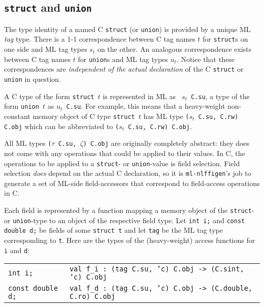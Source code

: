 \documentclass[titlepage,letterpaper]{article}
\newcommand{\gentool}{{\tt ml-nlffigen}}
\begin{document}
\subsection{{\tt struct} and {\tt union}}
 
The type identity of a named C {\tt struct} (or {\tt union}) is
provided by a unique ML {\em tag} type.  There is a 1-1 correspondence
between C tag names $t$ for {\tt struct}s on one side and ML tag types
$s_t$ on the other.  An analogous correspondence exists between C tag
names $t$ for {\tt union}s and ML tag types $u_t$.  Notice that these
correspondences are {\em independent of the actual declaration} of the
C {\tt struct} or {\tt union} in question.

A C type of the form {\tt struct $t$} is represented in ML as {\tt
  $s_t$ C.su}, a type of the form {\tt union $t$} as {\tt $u_t$ C.su}.
For example, this means that a heavy-weight non-constant memory object
of C type {\tt struct $t$} has ML type {\tt ($s_t$ C.su, C.rw) C.obj}
which can be abbreviated to {\tt ($s_t$ C.su, C.rw) C.obj}.

All ML types {\tt ($\tau$ C.su, $\zeta$) C.obj} are originally
completely abstract: they does not come with any operations that could
be applied to their values.  In C, the operations to be applied to a
{\tt struct}- or {\tt union}-value is field selection.  Field
selection {\em does} depend on the actual C declaration, so it is
{\gentool}'s job to generate a set of ML-side field-accessors that
correspond to field-access operations in C.

Each field is represented by a function mapping a memory object of the
{\tt struct}- or {\tt union}-type to an object of the respective field
type.  Let {\tt int i;} and {\tt const double d;} be fields of some
{\tt struct t} and let {\tt tag} be the ML tag type corresponding to
{\tt t}.  Here are the types of the (heavy-weight) access functions
for {\tt i} and {\tt d}:

\begin{small}
\begin{center}
\begin{tabular}{l@{~~~~$\leadsto$~~~~}l}
{\tt int i;} &
  {\tt val f\_i : (tag C.su, 'c) C.obj -> (C.sint, 'c) C.obj} \\
{\tt const double d;} &
  {\tt val f\_d : (tag C.su, 'c) C.obj -> (C.double, C.ro) C.obj}
\end{tabular}
\end{center}
\end{small}
\end{document}
